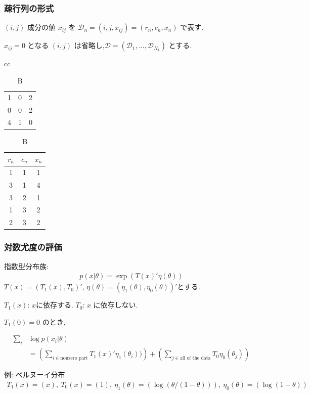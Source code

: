 \documentclass[dvipdfmx, dvipsnames]{beamer}
\begin{document}
 \begin{frame} 
 \frametitle{疎行列の形式}
$(i,j)$ 成分の値 $x_{ij}$ を $ \mathcal{D}_n  = (i,j,x_{ij})=(r_n, c_n, x_n)$ で表す. 

$x_{ij}=0$ となる $(i,j)$ は省略し,$\mathcal{D}=(\mathcal{D}_1, \ldots, \mathcal{D}_{N_1})$ とする. 
\begin{table}[tbp]
\centering
\caption{AとBは同じ情報を持つ}
\begin{tabular}{cc}
\begin{minipage}{0.3\linewidth}
\centering
{
\caption{A}
\begin{tabular}{|ccc|}
\hline
1 & 0 & 2\\
0 & 0 & 2\\
4 & 1 & 0\\
\hline
\end{tabular}
}
\end{minipage}
\begin{minipage}{0.3\linewidth}
\centering
{
\caption{B}
\begin{tabular}{ccc}
\hline
$r_n$ & $c_n$ & $x_n$\\
\hline
1 & 1 & 1\\
3 & 1 & 4\\
3 & 2 & 1\\
1 & 3 & 2\\
2 & 3 & 2\\
\hline
\end{tabular}
}
\end{minipage}
\end{tabular}
\end{table}
 \end{frame}
 
\begin{frame} 
\frametitle{対数尤度の評価}

指数型分布族:
\begin{align*}
p(x|\theta) = \exp( T(x)' \eta(\theta))
\end{align*}
$T(x) = (T_1(x), T_0)'$, $\eta(\theta) = (\eta_1(\theta), \eta_0(\theta))'$とする.

 $T_1(x)$: $x$に依存する. $T_0$: $x$ に依存しない. 

$T_1(0)=0$ のとき,

\begin{align*}
\sum_i &\log p(x_i|\theta) \\
&= \left(\sum_{i \in \mbox{nonzero part}}T_1(x)'  \eta_1(\theta_i))\right) + \left(\sum_{j \in \mbox{all of the data}}{T_0 \eta_0(\theta_j)}\right)
\end{align*}

例: ベルヌーイ分布
\begin{align*}
T_1(x) = (x),~ T_0(x) = (1),~ \eta_1(\theta) = (\log(\theta/(1-\theta))), ~\eta_0(\theta)=(\log(1-\theta))
\end{align*}
\end{frame}
 
\end{document}
